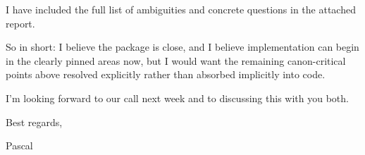 \documentclass[11pt]{article}
\begin{document}
I have included the full list of ambiguities and concrete questions in the attached report.

So in short: I believe the package is close, and I believe implementation can begin in the clearly pinned areas now, but I would want the remaining canon-critical points above resolved explicitly rather than absorbed implicitly into code.

I’m looking forward to our call next week and to discussing this with you both.

Best regards,

Pascal
\end{document}
